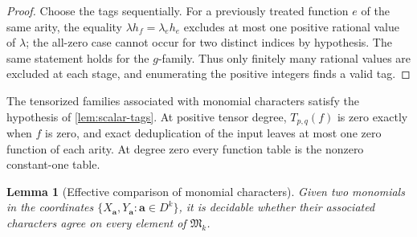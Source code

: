 \documentclass[11pt]{article}
\theoremstyle{plain}
\newtheorem{lemma}[lemma]{Lemma}
\theoremstyle{definition}
\theoremstyle{remark}
\newcommand{\InstMonoid}[1]{\mathfrak M_{#1}}
\begin{document}
\begin{proof}
Choose the tags sequentially.  For a previously treated function $e$ of the
same arity, the equality
$\lambda h_f=\lambda_e h_e$ excludes at most one positive rational value of
$\lambda$; the all-zero case cannot occur for two distinct indices by
hypothesis.  The same statement holds for the $g$-family.  Thus only finitely
many rational values are excluded at each stage, and enumerating the positive
integers finds a valid tag.
\end{proof}

The tensorized families associated with monomial characters satisfy the
hypothesis of \cref{lem:scalar-tags}.  At positive tensor degree,
$T_{p,q}(f)$ is zero exactly when $f$ is zero, and exact deduplication of the
input leaves at most one zero function of each arity.  At degree zero every
function table is the nonzero constant-one table.

\begin{lemma}[Effective comparison of monomial characters]
\label{lem:character-comparison}
Given two monomials in the coordinates
$\{X_{\mathbf a},Y_{\mathbf a}:\mathbf a\in D^k\}$, it is decidable whether
their associated characters agree on every element of $\InstMonoid{k}$.
\end{lemma}
\end{document}
